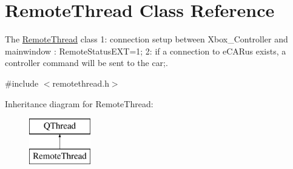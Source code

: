 \hypertarget{class_remote_thread}{}\section{Remote\+Thread Class Reference}
\label{class_remote_thread}


The \hyperlink{class_remote_thread}{Remote\+Thread} class 1\+: connection setup between Xbox\+\_\+\+Controller and mainwindow \+: Remote\+Status\+E\+X\+T=1; 2\+: if a connection to e\+C\+A\+Rus exists, a controller command will be sent to the car;.  




{\ttfamily \#include $<$remotethread.\+h$>$}

Inheritance diagram for Remote\+Thread\+:\begin{figure}[H]
\begin{center}
\leavevmode
\includegraphics[height=2.000000cm]{class_remote_thread}
\end{center}
\end{figure}
